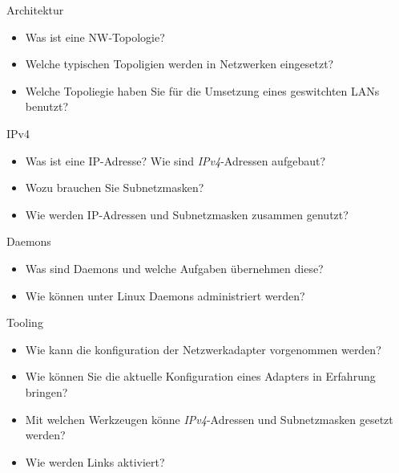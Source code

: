 \documentclass[xcolor=dvipsnames, aspectratio=169]{beamer}
\begin{document}
\begin{frame}{Architektur}
	\begin{itemize}
		\item Was ist eine NW-Topologie?
		\item Welche typischen Topoligien werden in Netzwerken eingesetzt?
		\item Welche Topoliegie haben Sie für die Umsetzung eines geswitchten LANs benutzt?
	\end{itemize}
\end{frame}

\begin{frame}{IPv4}
	\begin{itemize}
		\item Was ist eine IP-Adresse? Wie sind \emph{IPv4}-Adressen aufgebaut?
		\item Wozu brauchen Sie Subnetzmasken?
		\item Wie werden IP-Adressen und Subnetzmasken zusammen genutzt?
	\end{itemize}
\end{frame}

\begin{frame}{Daemons}
	\begin{itemize}
		\item Was sind Daemons und welche Aufgaben übernehmen diese?
		\item Wie können unter Linux Daemons administriert werden?
	\end{itemize}
\end{frame}

\begin{frame}{Tooling}
	\begin{itemize}
		\item Wie kann die konfiguration der Netzwerkadapter vorgenommen werden?
		\item Wie können Sie die aktuelle Konfiguration eines Adapters in Erfahrung bringen?
		\item Mit welchen Werkzeugen könne \emph{IPv4}-Adressen und Subnetzmasken gesetzt werden?
		\item Wie werden Links aktiviert?
	\end{itemize}
\end{frame}
\end{document}
